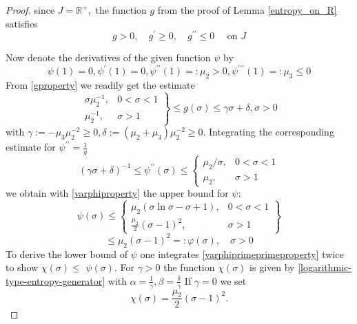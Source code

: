 \begin{proof}
	since $J=\mathbb{R}^{+},$ the function $g$ from the proof of Lemma \ref{entropy_on_R} satisfies
	\begin{equation}\label{gproperty}
	g>0, \quad g^{\prime} \geq 0, \quad g^{\prime \prime} \leq 0 \quad \text { on } J	
	\end{equation}

	
	Now denote the derivatives of the given function $\psi$ by
\begin{equation}\label{varphiproperty}
	\psi(1)=0, \psi^{\prime}(1)=0, \psi^{\prime \prime}(1)=: \mu_{2}>0, \psi^{\prime \prime \prime}(1)=: \mu_{3} \leq 0
\end{equation}
	From \eqref{gproperty} we readily get the estimate
	$$
	\left.\begin{array}{ll}
	\sigma \mu_{2}^{-1}, & 0<\sigma<1 \\
	\mu_{2}^{-1}, & \sigma>1
	\end{array}\right\} \leq g(\sigma) \leq \gamma \sigma+\delta, \sigma>0
	$$
	with $\gamma:=-\mu_{3} \mu_{2}^{-2} \geq 0, \delta:=\left(\mu_{2}+\mu_{3}\right) \mu_{2}^{-2} \geq 0 .$ Integrating the corresponding
	estimate for $\psi^{\prime \prime}=\frac{1}{g}$
	$$
	(\gamma \sigma+\delta)^{-1} \leq \psi^{\prime \prime}(\sigma) \leq\left\{\begin{array}{ll}
	\mu_{2} / \sigma, & 0<\sigma<1 \\
	\mu_{2}, & \sigma>1
	\end{array}\right.
	$$
	we obtain with \eqref{varphiproperty} the upper bound for $\psi:$
\begin{equation}\label{varphiprimeprimeproperty}
	\psi(\sigma) \leq\left\{\begin{array}{cl}
\mu_{2}(\sigma \ln \sigma-\sigma+1), & 0<\sigma<1 \\
\frac{\mu_{2}}{2}(\sigma-1)^{2}, & \sigma>1
\end{array}\right\}
\end{equation}
	$$
	\leq \mu_{2}(\sigma-1)^{2}=: \varphi(\sigma), \quad \sigma>0
	$$
	To derive the lower bound of $\psi$ one integrates \eqref{varphiprimeprimeproperty} twice to show $\chi(\sigma) \leq$ $\psi(\sigma) .$ For $\gamma>0$ the function $\chi(\sigma)$ is given by \eqref{logarithmic-type-entropy-generator} with $\alpha=\frac{1}{\gamma}, \beta=\frac{\delta}{\gamma}$
	If $\gamma=0$ we set
	$$
	\chi(\sigma)=\frac{\mu_{2}}{2}(\sigma-1)^{2}.
	$$
\end{proof}

